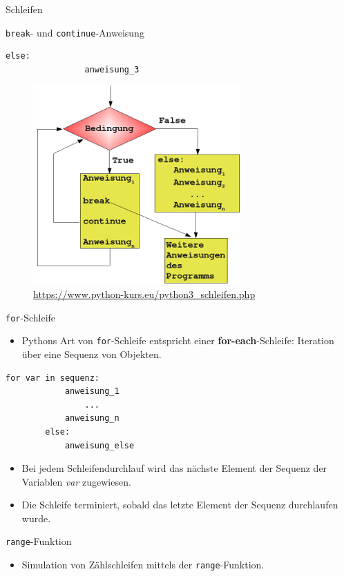 \documentclass[utf8, smaller, c]{beamer}
\renewcommand{\tt}[1]{{\texttt{#1}}}
\begin{document}
\begin{frame}{Schleifen}
\begin{block}{\tt{break}- und \tt{continue}-Anweisung}
\begin{minipage}[h]{0.4\textwidth}
\begin{lstlisting}[basicstyle=\footnotesize]
			else:
				anweisung_3
			\end{lstlisting}
		\end{minipage}
		\hfill
		\begin{minipage}[h]{0.58\textwidth}
			\begin{figure}[hb]
			    \centering
				\includegraphics[scale=0.4]{pics/schleife3.png}
				{\tiny\url{https://www.python-kurs.eu/python3_schleifen.php}}
			\end{figure}
		\end{minipage}
	\end{block}
	\pagebreak
	\begin{block}{\tt{for}-Schleife}
		\begin{itemize}
			\item Pythons Art von \tt{for}-Schleife entspricht einer \textbf{for-each}-Schleife: Iteration über eine Sequenz von Objekten.
		\end{itemize}
		\begin{lstlisting}[basicstyle=\footnotesize]
		for var in sequenz:
		    anweisung_1
		        ...
		    anweisung_n
		else:
			anweisung_else
		\end{lstlisting}
		\begin{itemize}
			\item Bei jedem Schleifendurchlauf wird das nächste Element der Sequenz der Variablen \textit{var} zugewiesen.
			\item Die Schleife terminiert, sobald das letzte Element der Sequenz durchlaufen wurde.
		\end{itemize}
	\end{block}
	\pagebreak
	\begin{block}{\tt{range}-Funktion}
		\begin{itemize}
			\item Simulation von Zählschleifen mittels der \tt{range}-Funktion.

\end{itemize}
\end{block}
\end{frame}
\end{document}
